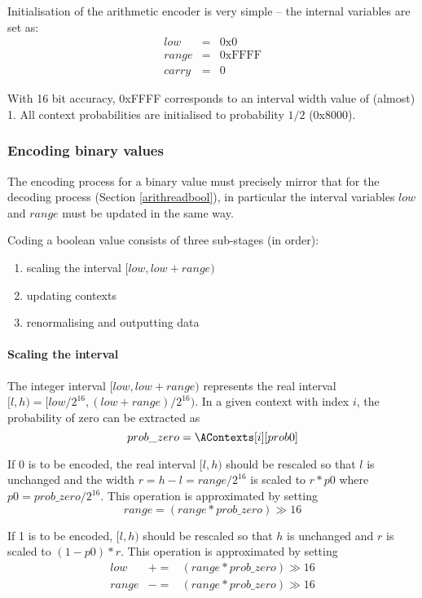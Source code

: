 \begin{informative*}
Initialisation of the arithmetic encoder is very simple -- the internal variables are
set as:
\begin{eqnarray*}
low&=&\text{0x0} \\
range&=&\text{0xFFFF} \\
carry&=&0
\end{eqnarray*}

With 16 bit accuracy, 0xFFFF corresponds to an interval width value of (almost) 1. All
context probabilities are initialised to probability $1/2$ (0x8000).

\subsubsection{Encoding binary values}
\label{arithwritebool}
The encoding process for a binary value must precisely mirror
that for the decoding process (Section \ref{arithreadbool}), in
particular the interval variables $low$ and $range$ must be
updated in the same way.

Coding a boolean value consists of three sub-stages (in order): 
\begin{enumerate}
\item{scaling the interval $[low,low+range)$}
\item{updating contexts}
\item{renormalising and outputting data}
\end{enumerate}

\paragraph*{Scaling the interval\\}
The integer interval $[low,low+range)$ represents the real interval
$[l,h)=[low/2^{16},(low+range)/2^{16})$. In a given context with index $i$,
the probability of zero can be extracted as 
\[prob\_zero=\AContexts[i][prob0]\]

If $0$ is to be encoded, the real interval $[l,h)$
should be rescaled so that $l$ is unchanged and the
width $r=h-l=range/2^{16}$ is scaled to $r*p0$ where $p0=prob\_zero/2^{16}$.
This operation is approximated by setting
\[range=(range*prob\_zero)\gg 16\]

If 1 is to be encoded, $[l,h)$ should be rescaled so that $h$ is
unchanged and $r$ is scaled to $(1-p0)*r$. This operation is
approximated by setting
\begin{eqnarray*}
low &+= & (range*prob\_zero)\gg 16 \\
range & -= & (range*prob\_zero)\gg 16
\end{eqnarray*}


\end{informative*}
